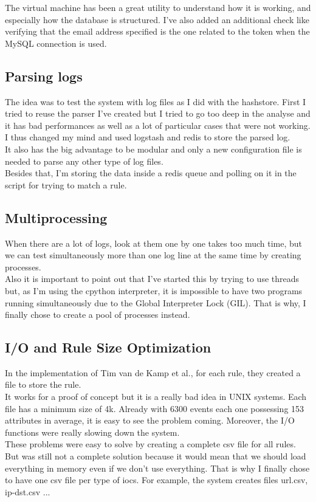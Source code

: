 \documentclass{eplmastersthesis}
\begin{document}
The virtual machine has been a great utility to understand how it is working, and especially how the database is structured. I've also added an additional check like verifying that the email address specified is the one related to the token when the MySQL connection is used.

\subsection{Parsing logs}
The idea was to test the system with log files as I did with the hashstore. First I tried to reuse the parser I've created but I tried to go too deep in the analyse and it has bad performances as well as a lot of particular cases that were not working.\\
I thus changed my mind and used logstash and redis to store the parsed log. \\
It also has the big advantage to be modular and only a new configuration file is needed to parse any other type of log files.\\
Besides that, I'm storing the data inside a redis queue and polling on it in the script for trying to match a rule. \\

\subsection{Multiprocessing}
When there are a lot of logs, look at them one by one takes too much time, but we can test simultaneously more than one log line at the same time by creating processes.\\
Also it is important to point out that I've started this by trying to use threads but, as I'm using the cpython interpreter, it is impossible to have two programs running simultaneously due to the Global Interpreter Lock (GIL). That is why, I finally chose to create a pool of processes instead.

\subsection{I/O and Rule Size Optimization}
In the implementation of Tim van de Kamp et al., for each rule, they created a file to store the rule. \\
It works for a proof of concept but it is a really bad idea in UNIX systems. Each file has a minimum size of 4k. Already with 6300 events each one possessing 153 attributes in average, it is easy to see the problem coming. Moreover, the I/O functions were really slowing down the system. \\
These problems were easy to solve by creating a complete \gls{csv} file for all rules. But was still not a complete solution because it would mean that we should load everything in memory even if we don't use everything. That is why I finally chose to have one \gls{csv} file per type of \gls{ioc}s. For example, the system creates files url.csv, ip-dst.csv ...
\end{document}
